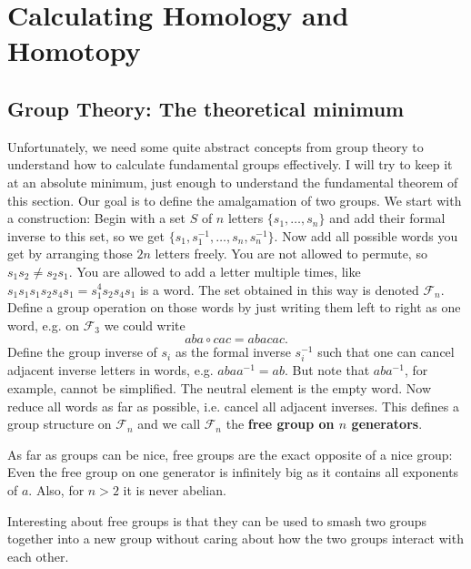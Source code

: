 \chapter{Calculating Homology and Homotopy}
\label{chap:matint}
\vspace*{-0.9cm}


\section{Group Theory: The theoretical minimum}
Unfortunately, we need some quite abstract concepts from group theory to understand how to calculate fundamental groups effectively. I will try to keep it at an absolute minimum, just enough to understand the fundamental theorem of this section.
Our goal is to define the amalgamation of two groups. We start with a construction:
Begin with a set $S$ of $n$ letters $\{s_1, \dots, s_n\}$ and add their formal inverse to this set, so we get $\{s_1, s_1^{-1}, \dots, s_n, s_n^{-1}\}$. Now add all possible words you get by arranging those $2n$ letters freely. You are not allowed to permute, so $s_1s_2 \neq s_2s_1$. You are allowed to add a letter multiple times, like $s_1 s_1 s_1 s_2 s_4 s_1 = s_1^4 s_2 s_4 s_1$ is a word. The set obtained in this way is denoted $\mathcal{F}_n$. Define a group operation on those words by just writing them left to right as one word, e.g. on $\mathcal{F}_3$ we could write $$aba \circ cac = abacac.$$ Define the group inverse of $s_i$ as the formal inverse $s_i^{-1}$ such that one can cancel adjacent inverse letters in words, e.g. $abaa^{-1} = ab$. But note that $aba^{-1}$, for example, cannot be simplified. The neutral element is the empty word. Now reduce all words as far as possible, i.e. cancel all adjacent inverses. This defines a group structure on $\mathcal{F}_n$ and we call $\mathcal{F}_n$ the \textbf{free group on $n$ generators}.
\begin{remark}
    As far as groups can be nice, free groups are the exact opposite of a nice group: Even the free group on one generator is infinitely big as it contains all exponents of $a$. Also, for $n>2$ it is never abelian.
\end{remark}
Interesting about free groups is that they can be used to smash two groups together into a new group without caring about how the two groups interact with each other.
